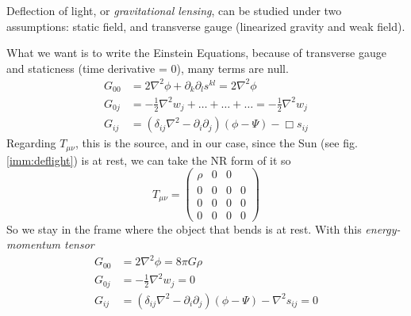 \bigskip
Deflection of light, or \emph{gravitational lensing}, can be studied under two assumptions: static field, and transverse gauge (linearized gravity and weak field).\par
What we want is to write the Einstein Equations, because of transverse gauge and staticness (time derivative = 0), many terms are null.
\begin{align}
	G_{00}& = 2\nabla ^{2}\phi  + \partial_{k}\partial_{l}s^{kl} = 2\nabla ^{2}\phi \\
	G_{0j}& = -\frac{1}{2}\nabla ^{2}w_{j}+ \ldots +\ldots +\ldots  = -\frac{1}{2}\nabla ^{2}w_{j} \\
G_{ij} & = \left( \delta _{ij}\nabla ^{2}-\partial_{i}\partial_{j} \right)\left( \phi -\Psi  \right)- \Box s_{ij} 
\end{align}
Regarding $T_{\mu \nu }$, this is the source, and in our case, since the Sun (see fig. \ref{imm:deflight}) is at rest, we can take the NR form of it so
\[
T_{\mu \nu } = \begin{pmatrix}
\rho  & 0 & 0 \\
0 & 0 & 0 & 0 \\
0 & 0 & 0 & 0 \\
0 & 0 & 0 & 0
\end{pmatrix} 
\]
So we stay in the frame where the object that bends is at rest. With this \emph{energy-momentum tensor} 
\begin{align}
	G_{00} &= 2\nabla ^{2}\phi = 8\pi G \rho \\
	G_{0j} &= -\frac{1}{2}\nabla ^{2}w_{j} = 0 \\
	G_{ij} &= \left( \delta _{ij}\nabla ^{2}- \partial_{i}\partial_{j} \right)\left( \phi -\Psi  \right)- \nabla ^{2}s_{ij} = 0
\end{align}
